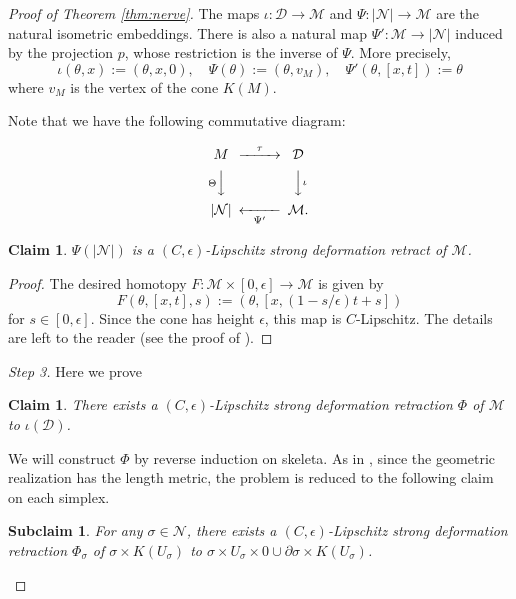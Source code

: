 \documentclass[a4paper,12pt]{amsart}
\theoremstyle{plain}
\newtheorem{clm}[thm]{Claim}
\newtheorem{subclm}[thm]{Subclaim}
\theoremstyle{definition}
\numberwithin{thm}{section}
\numberwithin{equation}{section}
\newcommand{\step}[1]{\medskip\noindent\textit{#1.}}
\begin{document}
\begin{proof}[Proof of Theorem \ref{thm:nerve}]
The maps $\iota:\mathcal D\to\mathcal M$ and $\Psi:|\mathcal N|\to\mathcal M$ are the natural isometric embeddings.
There is also a natural map $\Psi':\mathcal M\to|\mathcal N|$ induced by the projection $p$, whose restriction is the inverse of $\Psi$.
More precisely, 
\[\iota(\theta,x):=(\theta,x,0),\quad\Psi(\theta):=(\theta,v_M),\quad \Psi'(\theta,[x,t]):=\theta\]
where $v_M$ is the vertex of the cone $K(M)$.

Note that we have the following commutative diagram:

\begin{equation}\label{eq:Theta}
\begin{CD}
M @>\tau>> \mathcal D \\
@V\Theta VV @VV\iota V \\
|\mathcal N| @<<\Psi'< \mathcal M.
\end{CD}
\end{equation}

\begin{clm}\label{clm:Psi}
$\Psi(|\mathcal N|)$ is a $(C,\epsilon)$-Lipschitz strong deformation retract of $\mathcal M$.
\end{clm}

\begin{proof}
The desired homotopy $F:\mathcal M\times[0,\epsilon]\to\mathcal M$ is given by
\[F(\theta,[x,t],s):=(\theta, [x, (1-s/\epsilon)t+s])\]
for $s\in[0,\epsilon]$.
Since the cone has height $\epsilon$, this map is $C$-Lipschitz.
The details are left to the reader (see the proof of \cite[3.3]{MY:lip}).
\end{proof}

\step{Step 3}
Here we prove

\begin{clm}\label{clm:Phi}
There exists a $(C,\epsilon)$-Lipschitz strong deformation retraction $\Phi$ of $\mathcal M$ to $\iota(\mathcal D)$.
\end{clm}

We will construct $\Phi$ by reverse induction on skeleta.
As in \cite[\S3]{MY:lip}, since the geometric realization has the length metric, the problem is reduced to the following claim on each simplex.

\begin{subclm}\label{subclm:Phi}
For any $\sigma\in\mathcal N$, there exists a $(C,\epsilon)$-Lipschitz strong deformation retraction $\Phi_\sigma$ of $\sigma\times K(U_{\sigma})$ to $\sigma\times U_{\sigma}\times 0\cup\partial\sigma\times K(U_{\sigma})$.
\end{subclm}


\end{proof}
\end{document}
